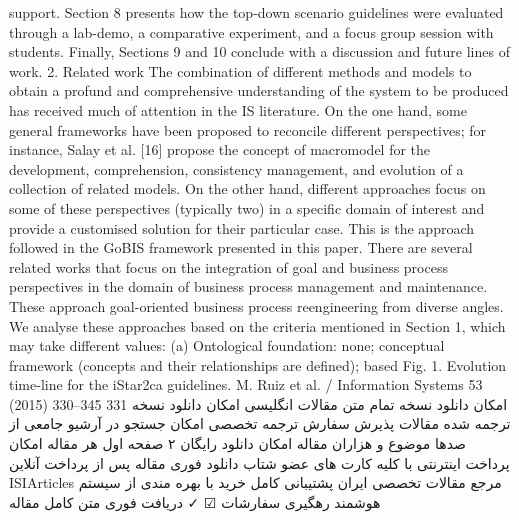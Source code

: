 support. Section 8 presents how the top-down scenario
guidelines were evaluated through a lab-demo, a comparative experiment, and a focus group session with
students. Finally, Sections 9 and 10 conclude with a
discussion and future lines of work.
2. Related work
The combination of different methods and models to
obtain a profund and comprehensive understanding of the
system to be produced has received much of attention in
the IS literature. On the one hand, some general frameworks have been proposed to reconcile different perspectives; for instance, Salay et al. [16] propose the concept of
macromodel for the development, comprehension, consistency management, and evolution of a collection of related
models. On the other hand, different approaches focus on
some of these perspectives (typically two) in a specific
domain of interest and provide a customised solution for
their particular case. This is the approach followed in the
GoBIS framework presented in this paper.
There are several related works that focus on the
integration of goal and business process perspectives in
the domain of business process management and maintenance. These approach goal-oriented business process
reengineering from diverse angles. We analyse these
approaches based on the criteria mentioned in Section 1,
which may take different values:
(a) Ontological foundation: none; conceptual framework
(concepts and their relationships are defined); based
Fig. 1. Evolution time-line for the iStar2ca guidelines.
M. Ruiz et al. / Information Systems 53 (2015) 330–345 331
امکان دانلود نسخه تمام متن مقالات انگلیسی
امکان دانلود نسخه ترجمه شده مقالات
پذیرش سفارش ترجمه تخصصی
امکان جستجو در آرشیو جامعی از صدها موضوع و هزاران مقاله
امکان دانلود رایگان ۲ صفحه اول هر مقاله
امکان پرداخت اینترنتی با کلیه کارت های عضو شتاب
دانلود فوری مقاله پس از پرداخت آنلاین
ISIArticles
مرجع مقالات تخصصی ایران
پشتیبانی کامل خرید با بهره مندی از سیستم هوشمند رهگیری سفارشات
☑
✓
دریافت فوری متن کامل مقاله